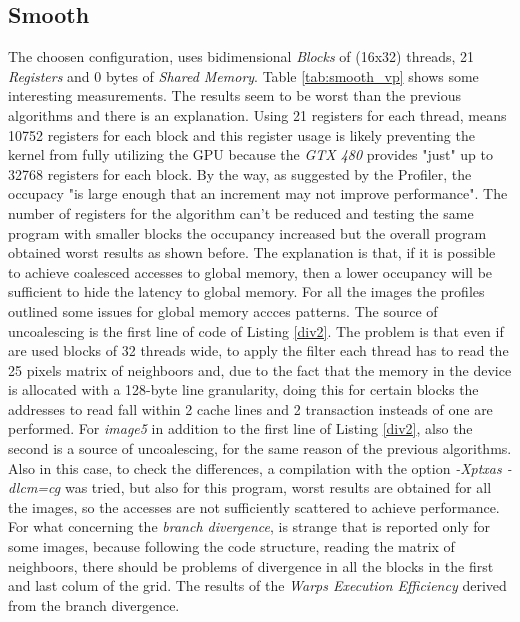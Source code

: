 \documentclass[a4paper]{article}
\begin{document}
\subsection{Smooth}
\label{sec:a3}
The choosen configuration, uses bidimensional \textit{Blocks} of (16x32) threads, 21 \textit{Registers} and 0 bytes of \textit{Shared Memory}. Table \ref{tab:smooth_vp} shows some interesting measurements. The results seem to be worst than the previous algorithms and there is an explanation. Using 21 registers for each thread, means 10752 registers for each block and this register usage is likely preventing the kernel from fully utilizing the GPU because the \textit{GTX 480} provides "just" up to 32768 registers for each block. By the way, as suggested by the Profiler, the occupacy "is large enough that an increment may not improve performance". The number of registers for the algorithm can't be reduced and testing the same program with smaller blocks the occupancy increased but the overall program obtained worst results as shown before. The explanation is that, if it is possible to achieve coalesced accesses to global memory, then a lower occupancy will be sufficient to hide the latency to global memory. For all the images the profiles outlined some issues for global memory accces patterns. The source of uncoalescing is the first line of code of Listing \ref{div2}. The problem is that even if are used blocks of 32 threads wide, to apply the filter each thread has to read the 25 pixels matrix of neighboors and, due to the fact that the memory in the device is allocated with a 128-byte line granularity, doing this for certain blocks the addresses to read fall within 2 cache lines and 2 transaction insteads of one are performed. For \textit{image5} in addition to the first line of Listing \ref{div2}, also the second is a source of uncoalescing, for the same reason of the previous algorithms. Also in this case, to check the differences, a compilation with the option \textit{-Xptxas -dlcm=cg} was tried, but also for this program, worst results are obtained for all the images, so the accesses are not sufficiently scattered to achieve performance. For what concerning the \textit{branch divergence}, is strange that is reported only for some images, because following the code structure, reading the matrix of neighboors, there should be problems of divergence in all the blocks in the first and last colum of the grid. The results of the \textit{Warps Execution Efficiency} derived from the branch divergence.
\end{document}
